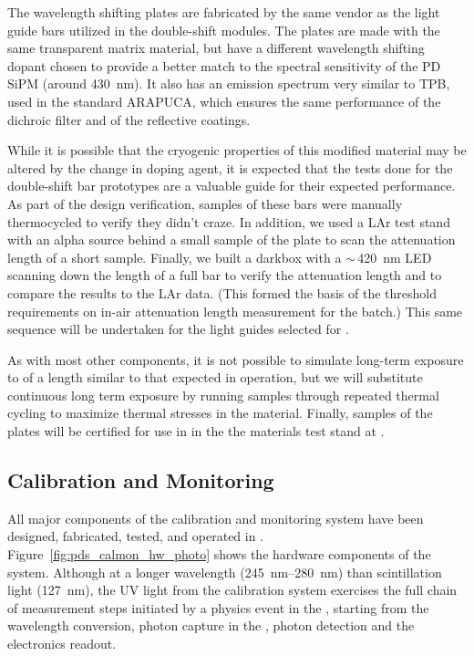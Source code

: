 The  wavelength shifting plates are fabricated by the same vendor as the light guide bars utilized in the double-shift  modules.  The plates are made with the same transparent matrix material, but have a different wavelength shifting dopant chosen to provide a better match to the spectral sensitivity of the PD SiPM (around \SI{430}{nm}). It also has an emission spectrum very similar to TPB, used in the standard ARAPUCA, which ensures the same performance of the dichroic filter and of the reflective coatings.

While it is possible that the cryogenic properties of this modified  material may be altered by the change in doping agent, it is expected that the tests done for the double-shift bar prototypes are a valuable guide for their expected performance.  As part of the design verification, samples of these bars were manually thermocycled to verify they didn't craze. In addition, we used a LAr test stand 
with an alpha source behind a small sample of the  plate to scan the attenuation length of a short sample. Finally, we built a darkbox with a $\sim\,$\SI{420}{nm} LED scanning down the length of a full bar to verify the attenuation length and to compare the results to the LAr data. (This formed the basis of the threshold requirements on in-air attenuation length measurement for the  batch.) 
This same sequence will be undertaken for the light guides selected for . 

As with most other components, it is not possible to simulate long-term exposure to  of a length similar to that expected in  operation, but we will substitute continuous long term exposure by running samples through repeated thermal cycling to maximize thermal stresses in the material.  Finally, samples of the  plates will be certified for use in  in the the materials test stand at .  


\subsection{Calibration and Monitoring}
\label{sec:fdsp-pd-validation-candm}

All major components of the   calibration and monitoring system have been designed, fabricated, tested, and operated in . Figure~\ref{fig:pds_calmon_hw_photo} shows the hardware components of the system.
Although at a longer wavelength (\SIrange{245}{280}{nm}) than \lar scintillation light (\SI{127}{nm}), the UV light from the calibration system exercises the full chain of measurement steps initiated by a physics event in the , starting from the wavelength conversion, photon capture in the , photon detection and the  electronics readout.

